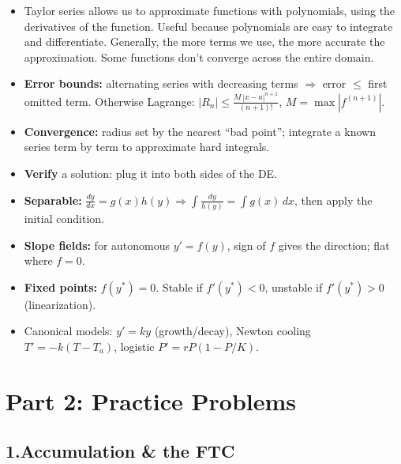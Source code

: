 \documentclass[11pt]{article}
\newcommand{\strand}[1]{%
  \vspace{0.8em}%
  \noindent{\large\textbf{\textcolor{secblue}{#1}}}\par\vspace{0.2em}%
}
\begin{document}
\strand{5.\quad Taylor Series}
\begin{itemize}[leftmargin=1.5em, itemsep=1pt]
  \item Taylor series allows us to approximate functions with polynomials, using the derivatives of the function. Useful because polynomials are easy to integrate and differentiate. Generally, the more terms we use, the more accurate the approximation. Some functions don't converge across the entire domain.
  \item \textbf{Error bounds:} alternating series with decreasing terms $\Rightarrow$ error $\le$ first omitted term. Otherwise Lagrange: $|R_n|\le \frac{M\,|x-a|^{n+1}}{(n+1)!}$, $M=\max|f^{(n+1)}|$.
  \item \textbf{Convergence:} radius set by the nearest ``bad point''; integrate a known series term by term to approximate hard integrals.
\end{itemize}

\strand{6.\quad Differential Equations \& Dynamics (Objective 3) --- lighter on the exam}
\begin{itemize}[leftmargin=1.5em, itemsep=1pt]
  \item \textbf{Verify} a solution: plug it into both sides of the DE.
  \item \textbf{Separable:} $\frac{dy}{dx}=g(x)h(y)\Rightarrow \int\frac{dy}{h(y)}=\int g(x)\,dx$, then apply the initial condition.
  \item \textbf{Slope fields:} for autonomous $y'=f(y)$, sign of $f$ gives the direction; flat where $f=0$.
  \item \textbf{Fixed points:} $f(y^*)=0$. Stable if $f'(y^*)<0$, unstable if $f'(y^*)>0$ (linearization).
  \item Canonical models: $y'=ky$ (growth/decay), Newton cooling $T'=-k(T-T_a)$, logistic $P'=rP(1-P/K)$.
\end{itemize}

\newpage
\section*{Part 2: Practice Problems}

\subsection*{1.\quad Accumulation \& the FTC}
\end{document}
